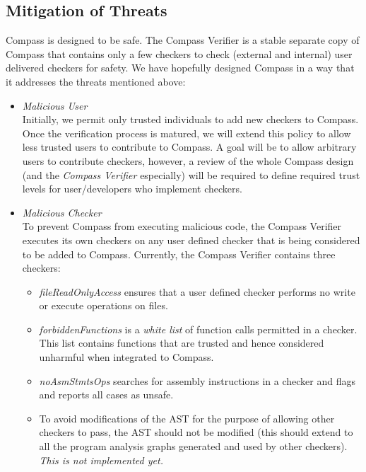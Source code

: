 \subsection{Mitigation of Threats}

Compass is designed to be safe. The Compass Verifier is a stable separate copy of Compass
that contains only a few checkers to check (external and internal) user delivered checkers
for safety.  We have hopefully designed Compass in a way that it addresses the threats
mentioned above:
\begin{itemize}
\item \emph{Malicious User} \\ Initially, we permit only trusted individuals to add new
    checkers to Compass. Once the verification process is matured, we will extend this
    policy to allow less trusted users to contribute to Compass. A goal will be to allow
    arbitrary users to contribute checkers, however, a review of the whole Compass design
    (and the {\em Compass Verifier} especially) will be required to define required trust
    levels for user/developers who implement checkers.

\item \emph{Malicious Checker} \\ To prevent Compass from executing malicious code, the Compass
    Verifier executes its own checkers on any user defined checker that is being
    considered to be added to Compass. Currently, the Compass Verifier contains three checkers:
   \begin{itemize}
      \item \emph{fileReadOnlyAccess} ensures that a user defined checker performs no write
         or execute operations on files.
      \item \emph{forbiddenFunctions} is a {\em white list} of function calls permitted in
         a checker. This list contains functions that are trusted and hence considered
         unharmful when integrated to Compass.
      \item \emph{noAsmStmtsOps} searches for assembly instructions in a checker and flags
         and reports all cases as unsafe.
      \item To avoid modifications of the AST for the purpose of allowing other checkers
         to pass, the AST should not be modified (this should extend to all the
         program analysis graphs generated and used by other checkers).
         {\em This is not implemented yet.} 
\end{itemize}


\end{itemize}
